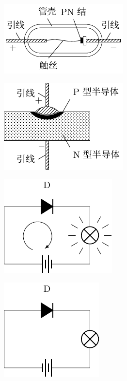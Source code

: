 \begin{figure}[htbp]
    \centering
    \begin{subfigure}{0.4\linewidth}
        \centering
        \includegraphics{fig/B/8-25a.pdf}
        \caption{}\label{fig_B_8-25a}
    \end{subfigure}
    \hfil
    \begin{subfigure}{0.4\linewidth}
        \centering
        \includegraphics{fig/B/8-25b.pdf}
        \caption{}\label{fig_B_8-25b}
    \end{subfigure}
    \caption{}\label{fig_B_8-25}
\end{figure}

\begin{figure}[htbp]
    \centering
    \begin{subfigure}{0.4\linewidth}
        \centering
        \includegraphics{fig/B/8-26a.pdf}
        \caption{}\label{fig_B_8-26a}
    \end{subfigure}
    \hfil
    \begin{subfigure}{0.4\linewidth}
        \centering
        \includegraphics{fig/B/8-26b.pdf}
        \caption{}\label{fig_B_8-26b}
    \end{subfigure}
    \caption{}\label{fig_B_8-26}
\end{figure}

